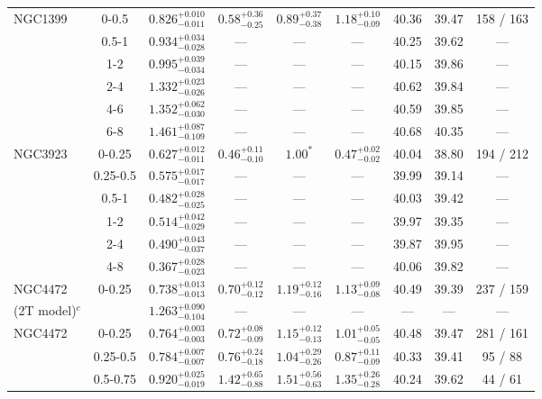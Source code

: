 \documentclass[structabstract]{aa}
\begin{document}
{{\begin{longtable}{lcccccccc}
\hline
NGC1399 & 0-0.5 & $ 0.826 _{- 0.011 }^{+ 0.010 } $ & $  0.58 _{-  0.25 }^{+  0.36 } $ & $  0.89 _{-  0.38 }^{+  0.37 } $ & $  1.18 _{-  0.09 }^{+  0.10 } $ &  40.36 & 39.47 &   158 /   163 \\
 & 0.5-1 & $ 0.934 _{- 0.028 }^{+ 0.034 } $ & --- & --- & --- &  40.25 & 39.62 & --- \\
 & 1-2 & $ 0.995 _{- 0.034 }^{+ 0.039 } $ & --- & --- & --- &  40.15 & 39.86 & --- \\
 & 2-4 & $ 1.332 _{- 0.026 }^{+ 0.023 } $ & --- & --- & --- &  40.62 & 39.84 & --- \\
 & 4-6 & $ 1.352 _{- 0.030 }^{+ 0.062 } $ & --- & --- & --- &  40.59 & 39.85 & --- \\
 & 6-8 & $ 1.461 _{- 0.109 }^{+ 0.087 } $ & --- & --- & --- &  40.68 & 40.35 & --- \\
\hline
NGC3923 & 0-0.25 & $ 0.627 _{- 0.011 }^{+ 0.012 } $ & $  0.46 _{-  0.10 }^{+  0.11 } $ & $ 1.00^{\ast} $ & $  0.47 _{-  0.02 }^{+  0.02 } $ &  40.04 & 38.80 &   194 /   212 \\
 & 0.25-0.5 & $ 0.575 _{- 0.017 }^{+ 0.017 } $ & --- & --- & --- &  39.99 & 39.14 & --- \\
 & 0.5-1 & $ 0.482 _{- 0.025 }^{+ 0.028 } $ & --- & --- & --- &  40.03 & 39.42 & --- \\
 & 1-2 & $ 0.514 _{- 0.029 }^{+ 0.042 } $ & --- & --- & --- &  39.97 & 39.35 & --- \\
 & 2-4 & $ 0.490 _{- 0.037 }^{+ 0.043 } $ & --- & --- & --- &  39.87 & 39.95 & --- \\
 & 4-8 & $ 0.367 _{- 0.023 }^{+ 0.028 } $ & --- & --- & --- &  40.06 & 39.82 & --- \\
\hline
NGC4472 & 0-0.25 & $ 0.738 _{- 0.013 }^{+ 0.013 } $ & $  0.70 _{-  0.12 }^{+  0.12 } $ & $  1.19 _{-  0.16 }^{+  0.12 } $ & $  1.13 _{-  0.08 }^{+  0.09 } $ &  40.49 & 39.39 &   237 /   159 \\
(2T model)$^c$ & & $ 1.263 _{- 0.104 }^{+ 0.090 } $ & --- & --- & --- & --- & --- & --- \\
\hline
NGC4472 & 0-0.25 & $ 0.764 _{- 0.003 }^{+ 0.003 } $ & $  0.72 _{-  0.09 }^{+  0.08 } $ & $  1.15 _{-  0.13 }^{+  0.12 } $ & $  1.01 _{-  0.05 }^{+  0.05 } $ &  40.48 & 39.47 &   281 /   161 \\
 & 0.25-0.5 & $ 0.784 _{- 0.007 }^{+ 0.007 } $ & $  0.76 _{-  0.18 }^{+  0.24 } $ & $  1.04 _{-  0.26 }^{+  0.29 } $ & $  0.87 _{-  0.09 }^{+  0.11 } $ &  40.33 & 39.41 &    95 /    88 \\
 & 0.5-0.75 & $ 0.920 _{- 0.019 }^{+ 0.025 } $ & $  1.42 _{-  0.88 }^{+  0.65 } $ & $  1.51 _{-  0.63 }^{+  0.56 } $ & $  1.35 _{-  0.28 }^{+  0.26 } $ &  40.24 & 39.62 &    44 /    61 \\

\end{longtable}}}
\end{document}
